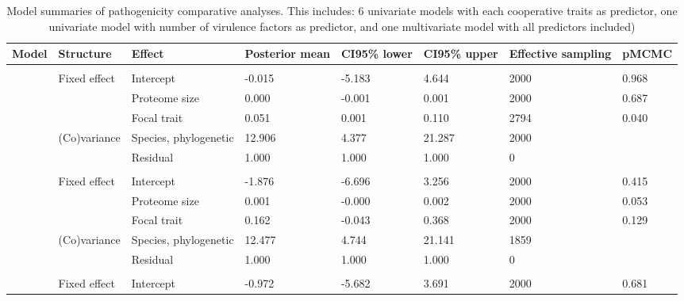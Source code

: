 \begin{table}

\caption{\label{tab:}Model summaries of pathogenicity comparative analyses. This includes: 6 univariate models with each cooperative traits as predictor, one univariate model with number of virulence factors as predictor, and one multivariate model with all predictors included)}
\centering
\begin{tabular}[t]{llllllll}
\toprule
Model & Structure & Effect & Posterior
 mean & CI95\% lower & CI95\% upper & Effective
 sampling & pMCMC\\
\midrule
\addlinespace[0.3em]
\multicolumn{8}{l}{\textbf{Secretome}}\\
\hspace{1em} & Fixed effect & Intercept & -0.015 & -5.183 & 4.644 & 2000 & 0.968\\
\hspace{1em} &  & Proteome size & 0.000 & -0.001 & 0.001 & 2000 & 0.687\\
\hspace{1em} &  & Focal trait & 0.051 & 0.001 & 0.110 & 2794 & 0.040\\
\hspace{1em} & (Co)variance & Species, phylogenetic & 12.906 & 4.377 & 21.287 & 2000 & \\
\hspace{1em} &  & Residual & 1.000 & 1.000 & 1.000 & 0 \vphantom{7} & \\
\addlinespace[0.3em]
\multicolumn{8}{l}{\textbf{Biofilm}}\\
\hspace{1em} & Fixed effect & Intercept & -1.876 & -6.696 & 3.256 & 2000 & 0.415\\
\hspace{1em} &  & Proteome size & 0.001 & -0.000 & 0.002 & 2000 & 0.053\\
\hspace{1em} &  & Focal trait & 0.162 & -0.043 & 0.368 & 2000 & 0.129\\
\hspace{1em} & (Co)variance & Species, phylogenetic & 12.477 & 4.744 & 21.141 & 1859 & \\
\hspace{1em} &  & Residual & 1.000 & 1.000 & 1.000 & 0 \vphantom{6} & \\
\addlinespace[0.3em]
\multicolumn{8}{l}{\textbf{Siderophores}}\\
\hspace{1em} & Fixed effect & Intercept & -0.972 & -5.682 & 3.691 & 2000 & 0.681\\

\end{tabular}
\end{table}
